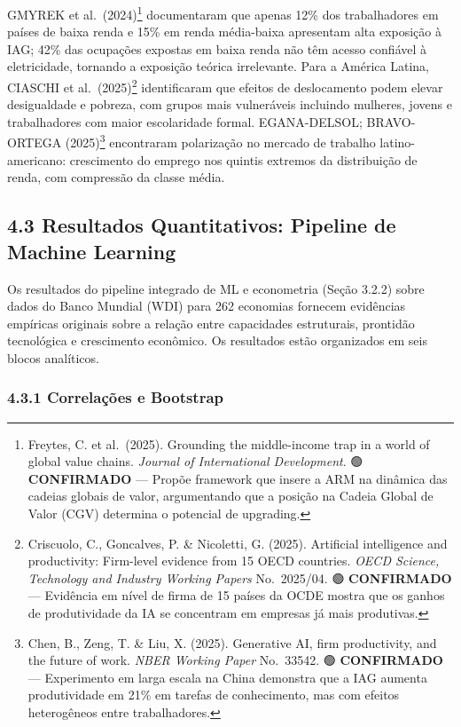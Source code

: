 \documentclass[
  brazilian,
  12pt,
]{article}
\begin{document}
GMYREK et al.~(2024)\footnote{Freytes, C. et al.~(2025). Grounding the middle-income trap in a world of global value chains. \emph{Journal of International Development}. 🟢 \textbf{CONFIRMADO} --- Propõe framework que insere a ARM na dinâmica das cadeias globais de valor, argumentando que a posição na Cadeia Global de Valor (CGV) determina o potencial de upgrading.} documentaram que apenas 12\% dos trabalhadores em países de baixa renda e 15\% em renda média-baixa apresentam alta exposição à IAG; 42\% das ocupações expostas em baixa renda não têm acesso confiável à eletricidade, tornando a exposição teórica irrelevante. Para a América Latina, CIASCHI et al.~(2025)\footnote{Criscuolo, C., Goncalves, P. \& Nicoletti, G. (2025). Artificial intelligence and productivity: Firm-level evidence from 15 OECD countries. \emph{OECD Science, Technology and Industry Working Papers} No.~2025/04. 🟢 \textbf{CONFIRMADO} --- Evidência em nível de firma de 15 países da OCDE mostra que os ganhos de produtividade da IA se concentram em empresas já mais produtivas.} identificaram que efeitos de deslocamento podem elevar desigualdade e pobreza, com grupos mais vulneráveis incluindo mulheres, jovens e trabalhadores com maior escolaridade formal. EGANA-DELSOL; BRAVO-ORTEGA (2025)\footnote{Chen, B., Zeng, T. \& Liu, X. (2025). Generative AI, firm productivity, and the future of work. \emph{NBER Working Paper} No.~33542. 🟢 \textbf{CONFIRMADO} --- Experimento em larga escala na China demonstra que a IAG aumenta produtividade em 21\% em tarefas de conhecimento, mas com efeitos heterogêneos entre trabalhadores.} encontraram polarização no mercado de trabalho latino-americano: crescimento do emprego nos quintis extremos da distribuição de renda, com compressão da classe média.

\subsection{4.3 Resultados Quantitativos: Pipeline de Machine Learning}\label{resultados-quantitativos-pipeline-de-machine-learning}

Os resultados do pipeline integrado de ML e econometria (Seção 3.2.2) sobre dados do Banco Mundial (WDI) para 262 economias fornecem evidências empíricas originais sobre a relação entre capacidades estruturais, prontidão tecnológica e crescimento econômico. Os resultados estão organizados em seis blocos analíticos.

\subsubsection{4.3.1 Correlações e Bootstrap}\label{correlauxe7uxf5es-e-bootstrap}
\end{document}
